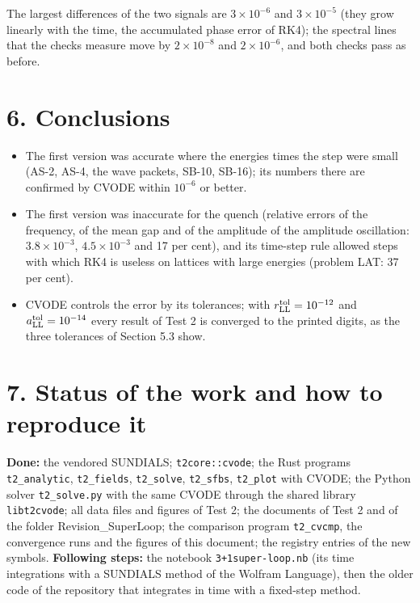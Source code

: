 \documentclass[
  10pt,
]{article}
\providecommand{\tightlist}{%
  \setlength{\itemsep}{0pt}\setlength{\parskip}{0pt}}
\begin{document}
The largest differences of the two signals are \(3\times10^{-6}\) and
\(3\times10^{-5}\) (they grow linearly with the time, the accumulated
phase error of RK4); the spectral lines that the checks measure move by
\(2\times10^{-8}\) and \(2\times10^{-6}\), and both checks pass as
before.

\hypertarget{conclusions}{%
\section{6. Conclusions}\label{conclusions}}

\begin{itemize}
\tightlist
\item
  The first version was accurate where the energies times the step were
  small (AS-2, AS-4, the wave packets, SB-10, SB-16); its numbers there
  are confirmed by CVODE within \(10^{-6}\) or better.
\item
  The first version was inaccurate for the quench (relative errors of
  the frequency, of the mean gap and of the amplitude of the amplitude
  oscillation: \(3.8\times10^{-3}\), \(4.5\times10^{-3}\) and 17 per
  cent), and its time-step rule allowed steps with which RK4 is useless
  on lattices with large energies (problem LAT: 37 per cent).
\item
  CVODE controls the error by its tolerances; with
  \(r^{\rm tol}_{\rm LL}=10^{-12}\) and
  \(a^{\rm tol}_{\rm LL}=10^{-14}\) every result of Test 2 is converged
  to the printed digits, as the three tolerances of Section 5.3 show.
\end{itemize}

\hypertarget{status-of-the-work-and-how-to-reproduce-it}{%
\section{7. Status of the work and how to reproduce
it}\label{status-of-the-work-and-how-to-reproduce-it}}

\textbf{Done:} the vendored SUNDIALS; \texttt{t2core::cvode}; the Rust
programs \texttt{t2\_analytic}, \texttt{t2\_fields}, \texttt{t2\_solve},
\texttt{t2\_sfbs}, \texttt{t2\_plot} with CVODE; the Python solver
\texttt{t2\_solve.py} with the same CVODE through the shared library
\texttt{libt2cvode}; all data files and figures of Test 2; the documents
of Test 2 and of the folder Revision\_SuperLoop; the comparison program
\texttt{t2\_cvcmp}, the convergence runs and the figures of this
document; the registry entries of the new symbols. \textbf{Following
steps:} the notebook \texttt{3+1super-loop.nb} (its time integrations
with a SUNDIALS method of the Wolfram Language), then the older code of
the repository that integrates in time with a fixed-step method.
\end{document}
